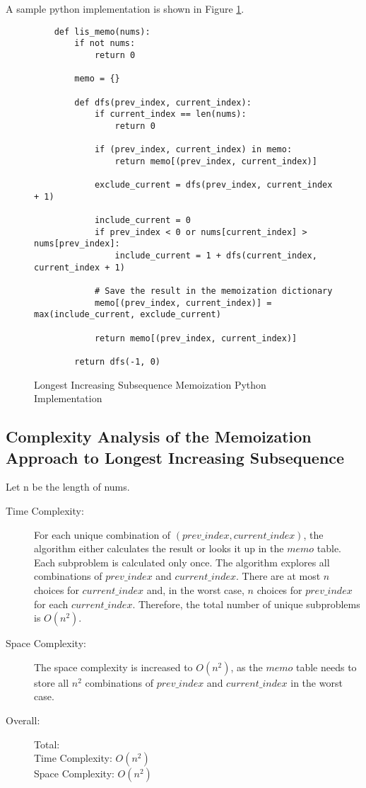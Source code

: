 A sample python implementation is shown in Figure \ref{fig:lis-memo}.

\begin{figure}[H]
    \centering
    \begin{lstlisting}
    def lis_memo(nums):
        if not nums:
            return 0
    
        memo = {}
    
        def dfs(prev_index, current_index):
            if current_index == len(nums):
                return 0
    
            if (prev_index, current_index) in memo:
                return memo[(prev_index, current_index)]
            
            exclude_current = dfs(prev_index, current_index + 1)
    
            include_current = 0
            if prev_index < 0 or nums[current_index] > nums[prev_index]:
                include_current = 1 + dfs(current_index, current_index + 1)
    
            # Save the result in the memoization dictionary
            memo[(prev_index, current_index)] = max(include_current, exclude_current)
    
            return memo[(prev_index, current_index)]
    
        return dfs(-1, 0)
    \end{lstlisting}
    \caption{Longest Increasing Subsequence Memoization Python Implementation}
    \label{fig:lis-memo}
\end{figure}



\subsection{Complexity Analysis of the Memoization Approach to Longest Increasing Subsequence}
Let n be the length of nums.
\begin{description}
    \item[Time Complexity:]
        For each unique combination of $(prev\_index, current\_index)$, the algorithm either calculates the result or looks it up in the $memo$ table.
        Each subproblem is calculated only once.
        The algorithm explores all combinations of $prev\_index$ and $current\_index$.
        There are at most $n$ choices for $current\_index$ and,
        in the worst case, $n$ choices for $prev\_index$ for each $current\_index$.
        Therefore, the total number of unique subproblems is $O(n^2)$.
        
    \item[Space Complexity:] 
        The space complexity is increased to $O(n^2)$,
        as the $memo$ table needs to store all $n^2$ combinations of $prev\_index$ and $current\_index$ in the worst case.
        
        
    \item[Overall:] Total:\\
        Time Complexity: $O(n^2)$\\
        Space Complexity: $O(n^2)$
    
\end{description}

